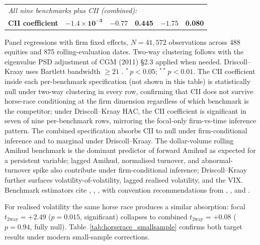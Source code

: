 \documentclass[preprint,12pt,authoryear]{elsarticle}
\begin{document}
\begin{table}[H]
\begin{threeparttable}
\begin{tabular}{lrrrrr}
\midrule
\multicolumn{6}{l}{\emph{All nine benchmarks plus CII (combined):}} \\
\textbf{CII coefficient} & $\mathbf{-1.4 \times 10^{-3}}$ & $\mathbf{-0.77}$ & \textbf{0.445} & $\mathbf{-1.75}$ & \textbf{0.080} \\
\bottomrule
\end{tabular}
\begin{tablenotes}
\small
\item Panel regressions with firm fixed effects, $N = 41{,}572$ observations across 488 equities and 875 rolling-evaluation dates. Two-way clustering follows \citet{cameron2011robust} with the eigenvalue PSD adjustment of CGM (2011) \S2.3 applied when needed. Driscoll--Kraay uses Bartlett bandwidth $\geq 21$ \citep{driscoll1998consistent}. ${}^{*}\,p < 0.05$; ${}^{**}\,p < 0.01$. The CII coefficient inside each per-benchmark specification (not shown in this table) is statistically null under two-way clustering in every row, confirming that CII does not survive horse-race conditioning at the firm dimension regardless of which benchmark is the competitor; under Driscoll--Kraay HAC, the CII coefficient is significant in seven of nine per-benchmark rows, mirroring the focal-only firm-vs-time inference pattern. The combined specification absorbs CII to null under firm-conditional inference and to marginal under Driscoll--Kraay. The dollar-volume rolling Amihud benchmark is the dominant predictor of forward Amihud as expected for a persistent variable; lagged Amihud, normalised turnover, and abnormal-turnover spike also contribute under firm-conditional inference; Driscoll--Kraay further surfaces volatility-of-volatility, lagged realised volatility, and the VIX. Benchmark estimators cite \citet{roll1984spread}, \citet{corwin2012simple}, \citet{amihud2002illiquidity}, with convention recommendations from \citet{goyenko2009liquidity}, \citet{hasbrouck2009trading}, and \citet{abdi2017simple}.
\end{tablenotes}
\end{threeparttable}
\end{table}

For realised volatility the same horse race produces a similar absorption: focal $t_{\mathrm{2way}} = +2.49$ ($p = 0.015$, significant) collapses to combined $t_{\mathrm{2way}} = +0.08$ ($p = 0.94$, fully null). Table~\ref{tab:horserace_smallsample} confirms both target results under modern small-sample corrections.
\end{document}
